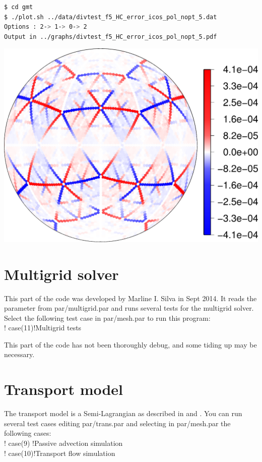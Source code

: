 \documentclass[a4paper,10pt]{article}
\begin{document}
\begin{lstlisting}[language=bash]
$ cd gmt
$ ./plot.sh ../data/divtest_f5_HC_error_icos_pol_nopt_5.dat
Options : 2-> 1-> 0-> 2
Output in ../graphs/divtest_f5_HC_error_icos_pol_nopt_5.pdf
\end{lstlisting}
\includegraphics[scale=0.5]{divtest_f5_HC_error_icos_pol_nopt_5}

\section{Multigrid solver}

This part of the code was developed by Marline I. Silva in Sept 2014. It reads the parameter from par/multigrid.par and runs several tests for the multigrid solver. Select the following test case in par/mesh.par to run this program:\\
!  case(11)!Multigrid tests

This part of the code has not been thoroughly debug, and some tiding up may be necessary.


\section{Transport model}

The transport model is a Semi-Lagrangian as described in \cite{Peixoto2013b} and \cite{Peixoto2014}. You can run several test cases editing par/trans.par and selecting in par/mesh.par the following cases:\\
!  case(9) !Passive advection simulation\\
!  case(10)!Transport flow simulation\\
\end{document}

